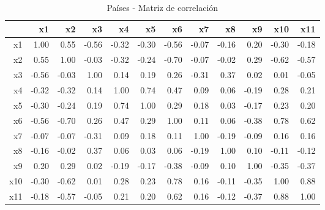 \begin{table}[ht]
\centering
\caption{Países - Matriz de correlación} 
\label{tabla:matriz_correlacion}
\begin{tabular}{rrrrrrrrrrrr}
  \hline
 & x1 & x2 & x3 & x4 & x5 & x6 & x7 & x8 & x9 & x10 & x11 \\ 
  \hline
x1 & 1.00 & 0.55 & -0.56 & -0.32 & -0.30 & -0.56 & -0.07 & -0.16 & 0.20 & -0.30 & -0.18 \\ 
  x2 & 0.55 & 1.00 & -0.03 & -0.32 & -0.24 & -0.70 & -0.07 & -0.02 & 0.29 & -0.62 & -0.57 \\ 
  x3 & -0.56 & -0.03 & 1.00 & 0.14 & 0.19 & 0.26 & -0.31 & 0.37 & 0.02 & 0.01 & -0.05 \\ 
  x4 & -0.32 & -0.32 & 0.14 & 1.00 & 0.74 & 0.47 & 0.09 & 0.06 & -0.19 & 0.28 & 0.21 \\ 
  x5 & -0.30 & -0.24 & 0.19 & 0.74 & 1.00 & 0.29 & 0.18 & 0.03 & -0.17 & 0.23 & 0.20 \\ 
  x6 & -0.56 & -0.70 & 0.26 & 0.47 & 0.29 & 1.00 & 0.11 & 0.06 & -0.38 & 0.78 & 0.62 \\ 
  x7 & -0.07 & -0.07 & -0.31 & 0.09 & 0.18 & 0.11 & 1.00 & -0.19 & -0.09 & 0.16 & 0.16 \\ 
  x8 & -0.16 & -0.02 & 0.37 & 0.06 & 0.03 & 0.06 & -0.19 & 1.00 & 0.10 & -0.11 & -0.12 \\ 
  x9 & 0.20 & 0.29 & 0.02 & -0.19 & -0.17 & -0.38 & -0.09 & 0.10 & 1.00 & -0.35 & -0.37 \\ 
  x10 & -0.30 & -0.62 & 0.01 & 0.28 & 0.23 & 0.78 & 0.16 & -0.11 & -0.35 & 1.00 & 0.88 \\ 
  x11 & -0.18 & -0.57 & -0.05 & 0.21 & 0.20 & 0.62 & 0.16 & -0.12 & -0.37 & 0.88 & 1.00 \\ 
   \hline
\end{tabular}
\end{table}
